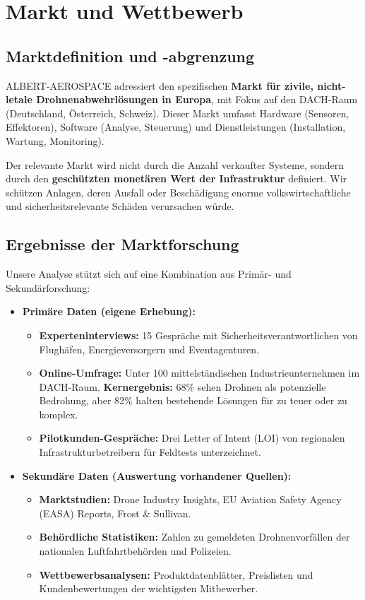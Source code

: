 \documentclass[11pt,a4paper]{article}
\begin{document}
\newpage

\section{Markt und Wettbewerb}

\subsection{Marktdefinition und -abgrenzung}
ALBERT-AEROSPACE adressiert den spezifischen \textbf{Markt für zivile, nicht-letale Drohnenabwehrlösungen in Europa}, mit Fokus auf den DACH-Raum (Deutschland, Österreich, Schweiz). Dieser Markt umfasst Hardware (Sensoren, Effektoren), Software (Analyse, Steuerung) und Dienstleistungen (Installation, Wartung, Monitoring).

Der relevante Markt wird nicht durch die Anzahl verkaufter Systeme, sondern durch den \textbf{geschützten monetären Wert der Infrastruktur} definiert. Wir schützen Anlagen, deren Ausfall oder Beschädigung enorme volkswirtschaftliche und sicherheitsrelevante Schäden verursachen würde.

\subsection{Ergebnisse der Marktforschung}
Unsere Analyse stützt sich auf eine Kombination aus Primär- und Sekundärforschung:

\begin{itemize}
    \item \textbf{Primäre Daten (eigene Erhebung):}
    \begin{itemize}
        \item \textbf{Experteninterviews:} 15 Gespräche mit Sicherheitsverantwortlichen von Flughäfen, Energieversorgern und Eventagenturen.
        \item \textbf{Online-Umfrage:} Unter 100 mittelständischen Industrieunternehmen im DACH-Raum. \textbf{Kernergebnis:} 68\% sehen Drohnen als potenzielle Bedrohung, aber 82\% halten bestehende Lösungen für zu teuer oder zu komplex.
        \item \textbf{Pilotkunden-Gespräche:} Drei Letter of Intent (LOI) von regionalen Infrastrukturbetreibern für Feldtests unterzeichnet.
    \end{itemize}
    
    \item \textbf{Sekundäre Daten (Auswertung vorhandener Quellen):}
    \begin{itemize}
        \item \textbf{Marktstudien:} Drone Industry Insights, EU Aviation Safety Agency (EASA) Reports, Frost \& Sullivan.
        \item \textbf{Behördliche Statistiken:} Zahlen zu gemeldeten Drohnenvorfällen der nationalen Luftfahrtbehörden und Polizeien.
        \item \textbf{Wettbewerbsanalysen:} Produktdatenblätter, Preislisten und Kundenbewertungen der wichtigsten Mitbewerber.
    \end{itemize}
\end{itemize}
\end{document}
